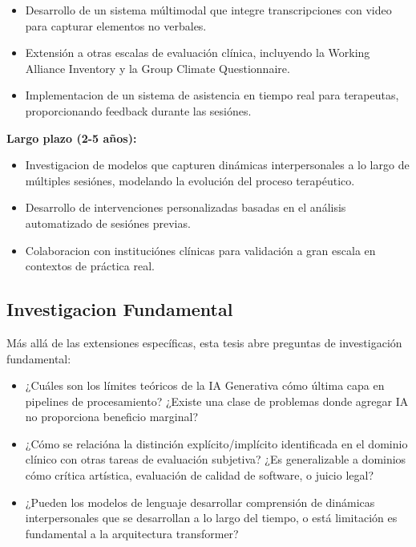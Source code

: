 \documentclass[12pt,a4paper,twoside]{book}
\begin{document}
\begin{itemize}
    \item Desarrollo de un sistema múltimodal que integre transcripciones con video para capturar elementos no verbales.
    \item Extensión a otras escalas de evaluación clínica, incluyendo la Working Alliance Inventory y la Group Climate Questionnaire.
    \item Implementacion de un sistema de asistencia en tiempo real para terapeutas, proporcionando feedback durante las sesiónes.
\end{itemize}

\textbf{Largo plazo (2-5 años):}

\begin{itemize}
    \item Investigacion de modelos que capturen dinámicas interpersonales a lo largo de múltiples sesiónes, modelando la evolución del proceso terapéutico.
    \item Desarrollo de intervenciones personalizadas basadas en el análisis automatizado de sesiónes previas.
    \item Colaboracion con instituciónes clínicas para validación a gran escala en contextos de práctica real.
\end{itemize}

\subsection{Investigacion Fundamental}

Más allá de las extensiones específicas, esta tesis abre preguntas de investigación fundamental:

\begin{itemize}
    \item ¿Cuáles son los límites teóricos de la IA Generativa cómo última capa en pipelines de procesamiento? ¿Existe una clase de problemas donde agregar IA no proporciona beneficio marginal?
    
    \item ¿Cómo se relacióna la distinción explícito/implícito identificada en el dominio clínico con otras tareas de evaluación subjetiva? ¿Es generalizable a dominios cómo crítica artística, evaluación de calidad de software, o juicio legal?
    
    \item ¿Pueden los modelos de lenguaje desarrollar comprensión de dinámicas interpersonales que se desarrollan a lo largo del tiempo, o está limitación es fundamental a la arquitectura transformer?
\end{itemize}
\end{document}
